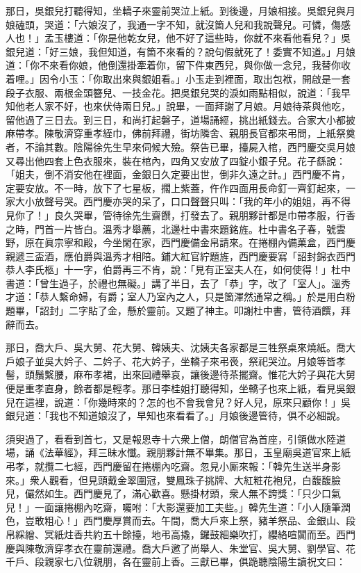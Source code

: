 那日，吳銀兒打聽得知，坐轎子來靈前哭泣上紙。到後邊，月娘相接。吳銀兒與月娘磕頭，哭道：「六娘沒了，我通一字不知，就沒箇人兒和我說聲兒。可憐，傷感人也！」孟玉樓道：「你是他乾女兒，他不好了這些時，你就不來看他看兒？」吳銀兒道：「好三娘，我但知道，有箇不來看的？說句假就死了！委實不知道。」月娘道：「你不來看你娘，他倒還掛牽着你，留下件東西兒，與你做一念兒，我替你收着哩。」因令小玉：「你取出來與銀姐看。」小玉走到裡面，取出包袱，開啟是一套段子衣服、兩根金頭簪兒、一技金花。把吳銀兒哭的淚如雨點相似，{}說道：「我早知他老人家不好，也來伏侍兩日兒。」說畢，一面拜謝了月娘。月娘待茶與他吃，留他過了三日去。到三日，和尚打起磐子，道場誦經，挑出紙錢去。合家大小都披麻帶孝。陳敬濟穿重孝絰巾，佛前拜禮，街坊隣舍、親朋長官都來弔問，上紙祭奠者，不論其數。陰陽徐先生早來伺候大殮。祭告已畢，擡屍入棺，西門慶交吳月娘又尋出他四套上色衣服來，裝在棺內，四角又安放了四錠小銀子兒。花子繇說：「姐夫，倒不消安他在裡面，金銀日久定要出世，倒非久遠之計。」西門慶不肯，定要安放。不一時，放下了七星板，擱上紫蓋，仵作四面用長命釘一齊釘起來，一家大小放聲号哭。西門慶亦哭的呆了，口口聲聲只叫：「我的年小的姐姐，再不得見你了！」良久哭畢，管待徐先生齋饌，打發去了。親朋夥計都是巾帶孝服，行香之時，門首一片皆白。溫秀才舉薦，北邊杜中書來題銘旌。杜中書名子春，號雲野，原在眞宗寧和殿，今坐閑在家，西門慶備金帛請來。在捲棚內備菓盒，西門慶親遞三盃酒，應伯爵與溫秀才相陪。鋪大紅官紵題旌，西門慶要寫「詔封錦衣西門恭人李氏柩」十一字，伯爵再三不肯，說：「見有正室夫人在，如何使得！」{}杜中書道：「曾生過子，於禮也無礙。」講了半日，去了「恭」字，改了「室人」。溫秀才道：「恭人繫命婦，有爵；室人乃室內之人，只是箇渾然通常之稱。」於是用白粉題畢，「詔封」二字貼了金，懸於靈前。又題了神主。叩謝杜中書，管待酒饌，拜辭而去。

那日，喬大戶、吳大舅、花大舅、韓姨夫、沈姨夫各家都是三牲祭桌來燒紙。喬大戶娘子並吳大妗子、二妗子、花大妗子，坐轎子來弔䘮，祭祀哭泣。月娘等皆孝髻，頭鬚繫腰，麻布孝裙，出來回禮舉哀，讓後邊待茶擺齋。惟花大妗子與花大舅便是重孝直身，餘者都是輕孝。那日李桂姐打聽得知，坐轎子也來上紙，看見吳銀兒在這裡，說道：「你幾時來的？怎的也不會我會兒？好人兒，原來只顧你！」吳銀兒道：「我也不知道娘沒了，早知也來看看了。」月娘後邊管待，俱不必細說。

須臾過了，看看到首七，又是報恩寺十六衆上僧，朗僧官為首座，引領做水陸道場，誦《法華經》，拜三昧水懺。親朋夥計無不畢集。那日，玉皇廟吳道官來上紙弔孝，就攬二七經，西門慶留在捲棚內吃齋。忽見小厮來報：「韓先生送半身影來。」衆人觀看，但見頭戴金翠圍冠，雙鳳珠子挑牌、大紅粧花袍兒，白馥馥臉兒，儼然如生。西門慶見了，滿心歡喜。懸掛材頭，衆人無不誇獎：「只少口氣兒！」一面讓捲棚內吃齋，囑咐：「大影還要加工夫些。」韓先生道：「小人隨筆潤色，豈敢粗心！」西門慶厚賞而去。午間，喬大戶來上祭，豬羊祭品、金銀山、段帛綵繒、冥紙炷香共約五十餘擡，地弔高撬，鑼鼓細樂吹打，纓絡喧闐而至。西門慶與陳敬濟穿孝衣在靈前還禮。喬大戶邀了尚舉人、朱堂官、吳大舅、劉學官、花千戶、段親家七八位親朋，各在靈前上香。三獻已畢，俱跪聽陰陽生讀祝文曰：

